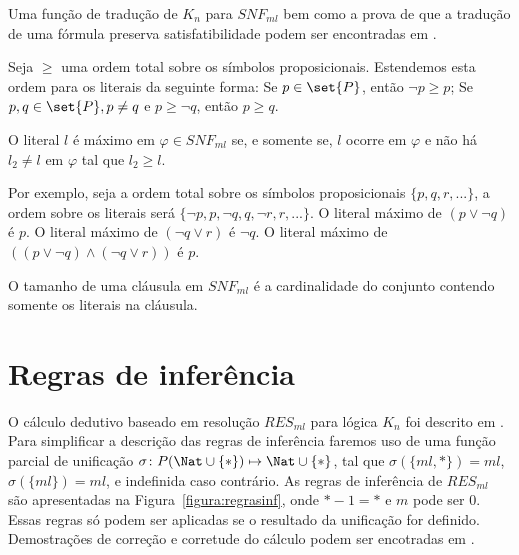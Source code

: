 Uma função de tradução de $K_n$ para $SNF_{ml}$ bem como a prova de que a tradução de uma fórmula preserva satisfatibilidade podem ser encontradas em \cite{nalontocl}.

Seja $\ge$ uma ordem total sobre os símbolos proposicionais. Estendemos esta ordem para os literais da seguinte forma: Se $p \in \set{P}$, então $\neg p \ge p$; Se $p, q \in \set{P}, p \not= q$ e $p \ge \neg q$, então $p \ge q$.

\begin{definition}
	O literal $l$ é máximo em $\varphi \in SNF_{ml}$ se, e somente se, $l$ ocorre em $\varphi$ e não há $l_2 \not= l$ em $\varphi$ tal que $l_2 \ge l$.
\end{definition}

Por exemplo, seja a ordem total sobre os símbolos proposicionais $\{p, q, r, ...\}$, a ordem sobre os literais será $\{\neg p, p, \neg q, q, \neg r, r, ...\}$. O literal máximo de $(p \lor \neg q)$ é $p$. O literal máximo de $(\neg q \lor r)$ é $\neg q$. O literal máximo de $((p \lor \neg q) \land (\neg q \lor r))$ é $p$.

\begin{definition}
	O tamanho de uma cláusula em $SNF_{ml}$ é a cardinalidade do conjunto contendo somente os literais na cláusula.
\end{definition}

\section{Regras de inferência} \label{secao:regrasinf}
O cálculo dedutivo baseado em resolução $RES_{ml}$ para lógica $K_n$ foi descrito em \cite{nalontocl}. Para simplificar a descrição das regras de inferência faremos uso de uma função parcial de unificação $\sigma \colon P(\Nat \cup \{*\}) \mapsto \Nat \cup \{*\}$, tal que $\sigma(\{ml, *\}) = ml$, $\sigma(\{ml\}) = ml$, e indefinida caso contrário. As regras de inferência de $RES_{ml}$ são apresentadas na Figura~\ref{figura:regrasinf}, onde $*-1=*$ e $m$ pode ser 0. Essas regras só podem ser aplicadas se o resultado da unificação for definido. Demostrações de correção e corretude do cálculo podem ser encotradas em \cite{nalontocl}.

